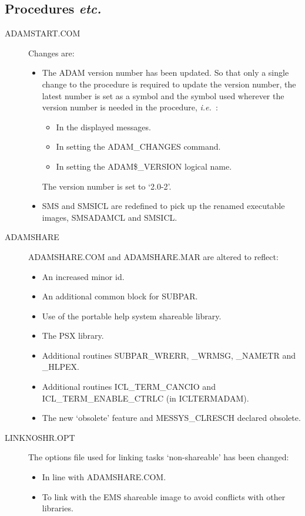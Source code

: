 \subsection{Procedures {\em etc.}}
\begin{description}

\item[ADAMSTART.COM] Changes are:
\begin{itemize}
\item The ADAM version number has been updated. So that
only a single change to the procedure is required to update the version 
number, the latest number is set as a symbol and the symbol used wherever the 
version number is needed in the procedure,
{\em i.e.\ }:
\begin{itemize}
\item In the displayed messages.
\item In setting the ADAM\_CHANGES command.
\item In setting the ADAM\$\_VERSION logical name.
\end{itemize}

The version number is set to `2.0-2'.

\item SMS and SMSICL are redefined to pick up the renamed executable images,
SMS\-ADAMCL and SMSICL.
\end{itemize}

\item[ADAMSHARE]
ADAMSHARE.COM and ADAMSHARE.MAR are altered to reflect:
\begin{itemize}
\item An increased minor id.
\item An additional common block for SUBPAR.
\item Use of the portable help system shareable library.
\item The PSX library.
\item Additional routines SUBPAR\_WRERR, \_WRMSG, \_NAMETR and \_HLPEX.
\item Additional routines ICL\_TERM\_CANCIO and ICL\_TERM\_ENABLE\_CTRLC
(in ICLTERMADAM).
\item The new `obsolete' feature and MESSYS\_CLRESCH declared obsolete.
\end{itemize}

\item[LINKNOSHR.OPT]
The options file used for linking tasks `non-shareable' has been changed:
\begin{itemize}
\item In line with ADAMSHARE.COM.
\item To link with the EMS shareable image to avoid conflicts with other
libraries.
\end{itemize}


\end{description}
